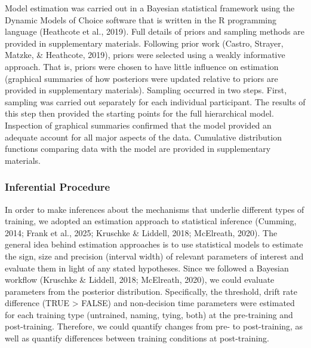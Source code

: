 \documentclass[
  english,
  man, donotrepeattitle,floatsintext]{apa6}
\begin{document}
Model estimation was carried out in a Bayesian statistical framework using the Dynamic Models of Choice software that is written in the R programming language (Heathcote et al., 2019). Full details of priors and sampling methods are provided in supplementary materials. Following prior work (Castro, Strayer, Matzke, \& Heathcote, 2019), priors were selected using a weakly informative approach. That is, priors were chosen to have little influence on estimation (graphical summaries of how posteriors were updated relative to priors are provided in supplementary materials). Sampling occurred in two steps. First, sampling was carried out separately for each individual participant. The results of this step then provided the starting points for the full hierarchical model. Inspection of graphical summaries confirmed that the model provided an adequate account for all major aspects of the data. Cumulative distribution functions comparing data with the model are provided in supplementary materials.

\subsubsection{Inferential Procedure}\label{inferential-procedure}

In order to make inferences about the mechanisms that underlie different types of training, we adopted an estimation approach to statistical inference (Cumming, 2014; Frank et al., 2025; Kruschke \& Liddell, 2018; McElreath, 2020). The general idea behind estimation approaches is to use statistical models to estimate the sign, size and precision (interval width) of relevant parameters of interest and evaluate them in light of any stated hypotheses. Since we followed a Bayesian workflow (Kruschke \& Liddell, 2018; McElreath, 2020), we could evaluate parameters from the posterior distribution. Specifically, the threshold, drift rate difference (TRUE \textgreater{} FALSE) and non-decision time parameters were estimated for each training type (untrained, naming, tying, both) at the pre-training and post-training. Therefore, we could quantify changes from pre- to post-training, as well as quantify differences between training conditions at post-training.
\end{document}
